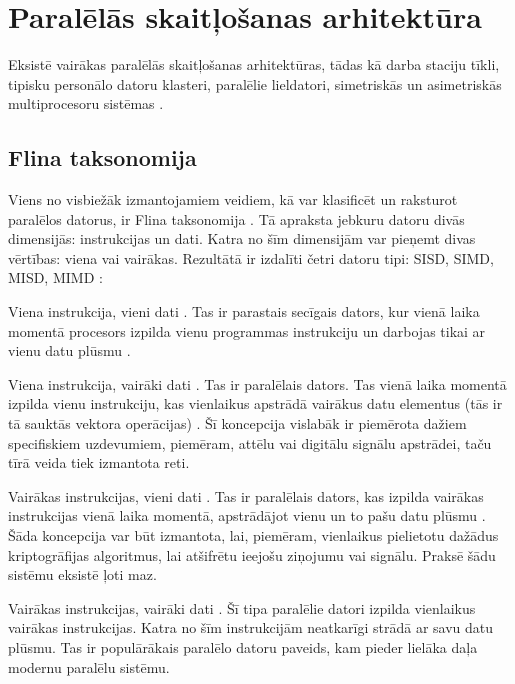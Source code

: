 
\section{Paralēlās skaitļošanas arhitektūra}
Eksistē vairākas paralēlās skaitļošanas arhitektūras, tādas kā darba staciju tīkli,
tipisku personālo datoru klasteri, paralēlie lieldatori, simetriskās un asimetriskās
multiprocesoru sistēmas \cite{PatParProg}.

\subsection{Flina taksonomija}
Viens no visbiežāk izmantojamiem veidiem, kā var klasificēt un raksturot paralēlos
datorus, ir Flina taksonomija . Tā apraksta jebkuru datoru
divās dimensijās: instrukcijas un dati. Katra no šīm dimensijām var pieņemt divas
vērtības: viena vai vairākas. Rezultātā ir izdalīti četri datoru tipi: SISD, SIMD,
MISD, MIMD  \cite{PatParProg, IntParComp}:
\begin{dotlist}
	\item Viena instrukcija, vieni dati .
		Tas ir parastais secīgais dators, kur vienā laika momentā procesors izpilda
		vienu programmas instrukciju un darbojas tikai ar vienu datu plūsmu .
	\item Viena instrukcija, vairāki dati .
		Tas ir paralēlais dators. Tas vienā laika momentā izpilda vienu instrukciju,
		kas vienlaikus apstrādā vairākus datu elementus (tās ir tā sauktās vektora
		operācijas) . Šī koncepcija vislabāk ir piemērota dažiem specifiskiem uzdevumiem,
		piemēram, attēlu vai digitālu signālu apstrādei, taču tīrā veida tiek
		izmantota reti.
	\item Vairākas instrukcijas, vieni dati .
		Tas ir paralēlais dators, kas izpilda vairākas instrukcijas vienā laika
		momentā, apstrādājot vienu un to pašu datu plūsmu . Šāda koncepcija var
		būt izmantota, lai, piemēram, vienlaikus pielietotu dažādus kriptogrāfijas
		algoritmus, lai atšifrētu ieejošu ziņojumu vai signālu. Praksē šādu sistēmu
		eksistē ļoti maz.
	\item Vairākas instrukcijas, vairāki dati .
		Šī tipa paralēlie datori izpilda vienlaikus vairākas instrukcijas. Katra
		no šīm instrukcijām neatkarīgi strādā ar savu datu plūsmu. Tas ir populārākais
		paralēlo datoru paveids, kam pieder lielāka daļa modernu paralēlu sistēmu.
\end{dotlist}

